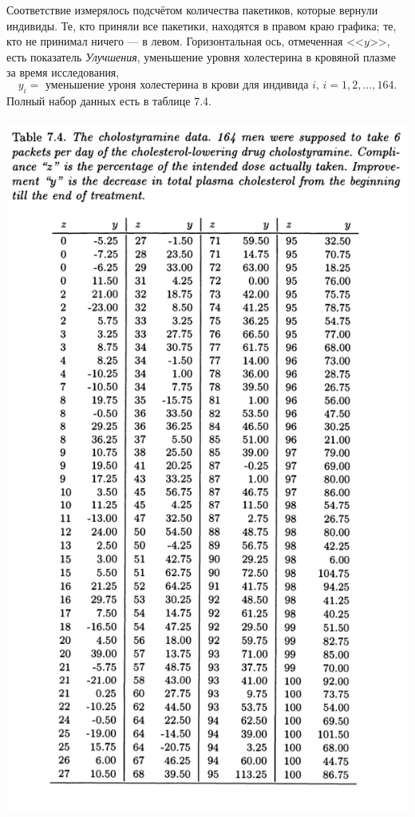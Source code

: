 Соответствие измерялось подсчётом количества пакетиков, которые вернули индивиды. Те, кто приняли все пакетики, находятся в правом краю графика; те, кто не принимал ничего --- в левом. Горизонтальная ось, отмеченная <<$y$>>, есть показатель \textit{Улучшения}, уменьшение уровня холестерина в кровяной плазме за время исследования,
$$
y_i = \text{ уменьшение уроня холестерина в крови для индивида } i,\, i = 1,2,\ldots, 164.
$$
Полный набор данных есть в таблице 7.4.
\\~\\
\noindent
\includegraphics[width=0.95\linewidth]{6/t74.png}
\newline
\setcounter{table}{4}

